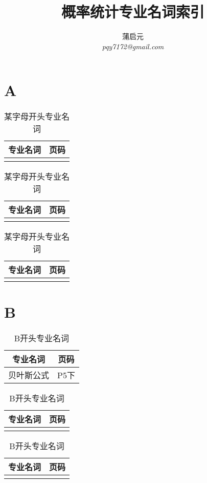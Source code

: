 \documentclass{wx672article}
\title{概率统计专业名词索引}
\author{蒲启元 \\
 \emph{pqy7172@gmail.com}}
\begin{document}
\maketitle{}



\section{A}
\label{sec:a}
\begin{table}[!ht] %
  \centering
  \begin{tabular}[t]{c|c} %
    \hline
    专业名词 &  页码   \\
    \hline
             &  \\
    \hline
  \end{tabular}
  \hfill
  \begin{tabular}[t]{c|c}
    \hline
    专业名词  &  页码  \\
    \hline
              &  \\
    \hline
  \end{tabular}
  \hfill
  \begin{tabular}[t]{c|c}
    \hline
    专业名词 &  页码 \\
    \hline
             &  \\
    \hline
  \end{tabular}
  \caption{某字母开头专业名词}\label{tabA}
\end{table}



\section{B}
\label{sec:b}
\begin{table}[!ht] %
  \centering
  \begin{tabular}[t]{c|c} %
    \hline
    专业名词 &  页码   \\
    \hline
    贝叶斯公式 &  P5下\\
    \hline
  \end{tabular}
  \hfill
  \begin{tabular}[t]{c|c}
    \hline
    专业名词  &  页码  \\
    \hline
              &  \\
    \hline
  \end{tabular}
  \hfill
  \begin{tabular}[t]{c|c}
    \hline
    专业名词 &  页码 \\
    \hline
             &  \\
    \hline
  \end{tabular}
  \caption{B开头专业名词}\label{tabB}
\end{table}
\end{document}
